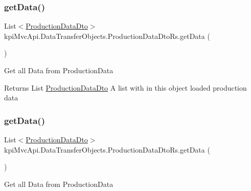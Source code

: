\subsubsection{\texorpdfstring{get\+Data()}{getData()}\hspace{0.1cm}{\footnotesize\ttfamily [1/2]}}
{\footnotesize\ttfamily List$<$\hyperlink{classkpi_mvc_api_1_1_data_transfer_objects_1_1_production_data_dto}{Production\+Data\+Dto}$>$ kpi\+Mvc\+Api.\+Data\+Transfer\+Objects.\+Production\+Data\+Dto\+Rs.\+get\+Data (\begin{DoxyParamCaption}{ }\end{DoxyParamCaption})\hspace{0.3cm}{\ttfamily [inline]}}



Get all Data from {\ttfamily Production\+Data} 

\begin{DoxyReturn}{Returns}
{\ttfamily  List \hyperlink{classkpi_mvc_api_1_1_data_transfer_objects_1_1_production_data_dto}{Production\+Data\+Dto} } A list with in this object loaded production data 
\end{DoxyReturn}
\mbox{\label{classkpi_mvc_api_1_1_data_transfer_objects_1_1_production_data_dto_rs_abd52b81c37bd026514f480e3d6dd952b}} 
\subsubsection{\texorpdfstring{get\+Data()}{getData()}\hspace{0.1cm}{\footnotesize\ttfamily [2/2]}}
{\footnotesize\ttfamily List$<$\hyperlink{classkpi_mvc_api_1_1_data_transfer_objects_1_1_production_data_dto}{Production\+Data\+Dto}$>$ kpi\+Mvc\+Api.\+Data\+Transfer\+Objects.\+Production\+Data\+Dto\+Rs.\+get\+Data (\begin{DoxyParamCaption}{ }\end{DoxyParamCaption})\hspace{0.3cm}{\ttfamily [inline]}}



Get all Data from {\ttfamily Production\+Data} 

